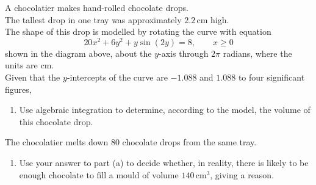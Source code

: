 \documentclass[leqno]{article}
\begin{document}
\begin{enumerate}[
  label=\textbf{\arabic*.},
  leftmargin=*,
  topsep=0pt,
  partopsep=0pt,
  parsep=0pt
]
\begin{figure}[H]
\end{figure}


A chocolatier makes hand-rolled chocolate drops. \\

The tallest drop in one tray was approximately $2.2\,\mathrm{cm}$ high. \\

The shape of this drop is modelled by rotating the curve with equation
\[
20x^2 + 6y^2 + y\sin(2y) = 8, \qquad x \geq 0
\]
shown in the diagram above, about the $y$-axis through $2\pi$ radians, where the units are cm. \\

Given that the $y$-intercepts of the curve are $-1.088$ and $1.088$ to four significant figures, \\

\begin{enumerate}[label=\textbf{(\alph*)}]
  \item Use algebraic integration to determine, according to the model, the volume of this chocolate drop.  \\
\end{enumerate}
The chocolatier melts down $80$ chocolate drops from the same tray. \\
\begin{enumerate}[label=\textbf{(\alph*)}, resume]
  \item Use your answer to part (a) to decide whether, in reality, there is likely to be enough chocolate to fill a mould of volume $140\,\mathrm{cm}^3$, giving a reason.  \\
\end{enumerate}

\newpage

\questionitem

\begin{figure}[H]
    \centering
{}
\end{figure}
\end{enumerate}
\end{document}
